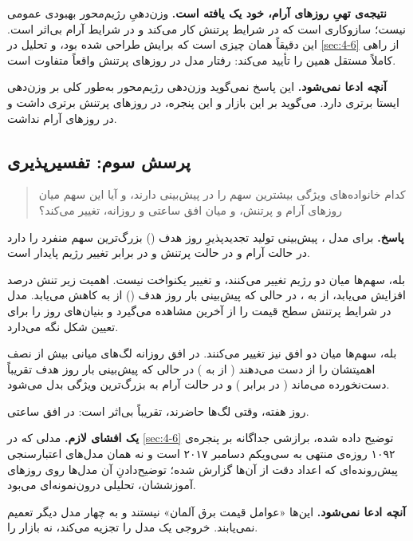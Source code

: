\textbf{نتیجه‌ی تهیِ روزهای آرام، خود یک یافته است.} وزن‌دهیِ رژیم‌محور بهبودی
عمومی نیست؛ سازوکاری است که در شرایط پرتنش کار می‌کند و در شرایط آرام بی‌اثر
است. این دقیقاً همان چیزی است که برایش طراحی شده بود، و تحلیل  در
\cref{sec:4-6} از راهی کاملاً مستقل همین را تأیید می‌کند: رفتار مدل در روزهای
پرتنش واقعاً متفاوت است.

\textbf{آنچه ادعا نمی‌شود.} این پاسخ نمی‌گوید وزن‌دهی رژیم‌محور به‌طور کلی بر
وزن‌دهی ایستا برتری دارد. می‌گوید بر این بازار و این پنجره، در روزهای پرتنش
برتری داشت و در روزهای آرام نداشت.

\subsection*{پرسش سوم: تفسیرپذیری}

\begin{quote}
کدام خانواده‌های ویژگی بیشترین سهم را در پیش‌بینی دارند، و آیا این سهم
میان روزهای آرام و پرتنش، و میان افق ساعتی و روزانه، تغییر می‌کند؟
\end{quote}

\textbf{پاسخ.} برای مدل ، پیش‌بینی تولید تجدیدپذیرِ روز هدف
() بزرگ‌ترین سهم منفرد را دارد   در حالت آرام
و  در حالت پرتنش  و در برابر تغییر رژیم پایدار است.

بله، سهم‌ها میان دو رژیم تغییر می‌کنند، و تغییر یکنواخت نیست. اهمیت
 زیر تنش  درصد افزایش می‌یابد، از  به
، در حالی که پیش‌بینی بار روز هدف () از 
به  کاهش می‌یابد. مدل در شرایط پرتنش سطح قیمت را از آخرین مشاهده
می‌گیرد و بنیان‌های روز را برای تعیین شکل نگه می‌دارد.

بله، سهم‌ها میان دو افق نیز تغییر می‌کنند. در افق روزانه لگ‌های میانی بیش از
نصف اهمیتشان را از دست می‌دهند ( از  به )
در حالی که پیش‌بینی بار روز هدف تقریباً دست‌نخورده می‌ماند ( در برابر
) و در حالت آرام به بزرگ‌ترین ویژگی بدل می‌شود.

روز هفته، وقتی لگ‌ها حاضرند، تقریباً بی‌اثر است:  در افق ساعتی.

\textbf{یک افشای لازم.} مدلی که در \cref{sec:4-6} توضیح داده شده، برازشی
جداگانه بر پنجره‌ی ۱۰۹۲ روزه‌ی منتهی به سی‌ویکم دسامبر ۲۰۱۷ است و نه همان
مدل‌های اعتبارسنجی پیش‌رونده‌ای که اعداد دقت از آن‌ها گزارش شده؛ توضیح‌دادنِ آن
مدل‌ها روی روزهای آموزششان، تحلیلی درون‌نمونه‌ای می‌بود.

\textbf{آنچه ادعا نمی‌شود.} این‌ها «عوامل قیمت برق آلمان» نیستند و به چهار مدل
دیگر تعمیم نمی‌یابند.  خروجی یک مدل را تجزیه می‌کند، نه بازار را.


